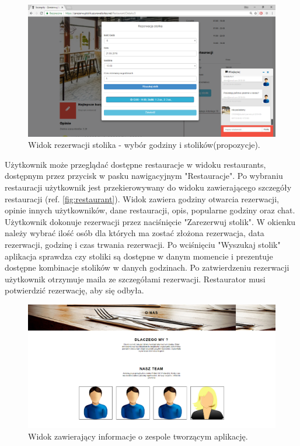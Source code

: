 \documentclass{article}
\begin{document}
\begin{figure}[H]
\centering
	\includegraphics[width=1.00\textwidth]{screens/reservation2.png}
	\caption{Widok rezerwacji stolika - wybór godziny i stolików(propozycje).}
	\label{fig:reservation}
\end{figure}

Użytkownik może przeglądać dostępne restauracje w widoku restaurants, dostępnym przez przycisk w pasku nawigacyjnym "Restauracje". Po wybraniu restauracji użytkownik jest przekierowywany do widoku zawierającego szczegóły restauracji (ref. \ref{fig:restaurant}). Widok zawiera godziny otwarcia rezerwacji, opinie innych użytkowników, dane restauracji, opis, popularne godziny oraz chat. Użytkownik dokonuje rezerwacji przez naciśnięcie "Zarezerwuj stolik". W okienku należy wybrać ilość osób dla których ma zostać złożona rezerwacja, data rezerwacji, godzinę i czas trwania rezerwacji. Po wciśnięciu "Wyszukaj stolik" aplikacja sprawdza czy stoliki są dostępne w danym momencie i prezentuje dostępne kombinacje stolików w danych godzinach. Po zatwierdzeniu rezerwacji użytkownik otrzymuje maila ze szczegółami rezerwacji. Restaurator musi potwierdzić rezerwację, aby się odbyła.

\begin{figure}[H]
\centering
	\includegraphics[width=1.00\textwidth]{screens/about.png}
	\caption{Widok zawierający informacje o zespole tworzącym aplikację.}
	\label{fig:about}
\end{figure}
\end{document}
